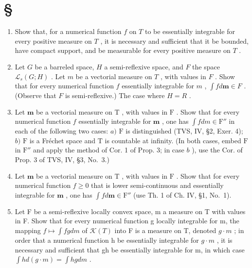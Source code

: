 \section*{\texorpdfstring{\S\CurrentExerciseGroup}{Section \CurrentExerciseGroup}}
{}

\begin{enumerate}
\def\labelenumi{\arabic{enumi})}
\item
  Show that, for a numerical function \(f\) on \(T\) to be essentially integrable for every positive measure on \(T\) , it is necessary and sufficient that it be bounded, have compact support, and be measurable for every positive measure on \(T\) .
\item
  Let \(G\) be a barreled space, \(H\) a semi-reflexive space, and \(F\) the space \(\mathcal{L}_s(G;H)\) . Let \(m\) be a vectorial measure on \(T\) , with values in \(F\) . Show that for every numerical function \(f\) essentially integrable for \(m\) , \(\int fd\mathbf{m} \in F\) . (Observe that \(F\) is semi-reflexive.) The case where \(H = R\) .
\item
  Let \(\mathbf{m}\) be a vectorial measure on \(\mathrm{T}\) , with values in \(\mathrm{F}\) . Show that for every numerical function \(f\) essentially integrable for \(\mathbf{m}\) , one has \(\int f dm \in \mathrm{F}''\) in each of the following two cases: \(a)\) \(\mathrm{F}\) is distinguished (TVS, IV, §2, Exer. 4); \(b)\) \(\mathrm{F}\) is a Fréchet space and \(\mathrm{T}\) is countable at infinity. (In both cases, embed \(\mathrm{F}\) in \(\mathrm{F}''\) and apply the method of Cor. 1 of Prop. 3; in case \(b\) ), use the Cor. of Prop. 3 of TVS, IV, §3, No.~3.)
\item
  Let \(\mathbf{m}\) be a vectorial measure on \(\mathrm{T}\) , with values in \(\mathrm{F}\) . Show that for every numerical function \(f \geqslant 0\) that is lower semi-continuous and essentially integrable for \(\mathbf{m}\) , one has \(\int f d\mathbf{m} \in \mathrm{F}''\) (use Th. 1 of Ch. IV, §1, No.~1).
\item
  Let F be a semi-reflexive locally convex space, m a measure on T with values in F. Show that for every numerical function g locally integrable for m, the mapping \(f \mapsto \int fg dm\) of \(\mathcal{K}(T)\) into F is a measure on T, denoted \(g \cdot m\) ; in order that a numerical function h be essentially integrable for \(g \cdot m\) , it is necessary and sufficient that gh be essentially integrable for m, in which case \(\int h d(g \cdot m) = \int hg dm\) .

\end{enumerate}
